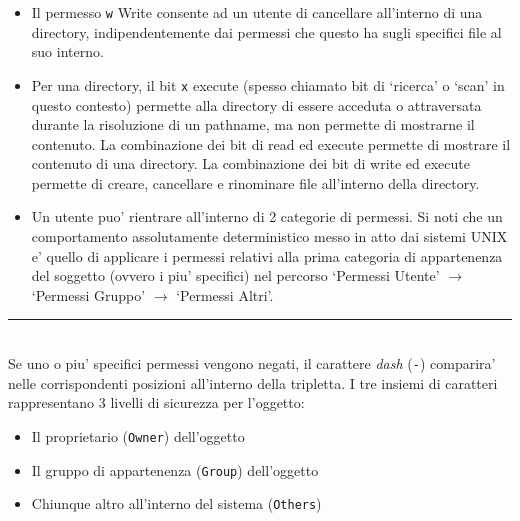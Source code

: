 \begin{itemize}
	\item Il permesso \texttt{w} Write consente ad un utente di cancellare all'interno di una directory, indipendentemente dai permessi che questo ha sugli specifici file al suo interno.
	\item Per una directory, il bit \texttt{x} execute (spesso chiamato bit di `ricerca' o `scan' in questo contesto) permette alla directory di essere acceduta o attraversata durante la risoluzione di un pathname, ma non permette di mostrarne il contenuto. La combinazione dei bit di read ed execute permette di mostrare il contenuto di una directory. La combinazione dei bit di write ed execute permette di creare, cancellare e rinominare file all'interno della directory.
	\item Un utente puo' rientrare all'interno di 2 categorie di permessi. Si noti che un comportamento assolutamente deterministico messo in atto dai sistemi UNIX e' quello di applicare i permessi relativi alla prima categoria di appartenenza del soggetto (ovvero i piu' specifici) nel percorso `Permessi Utente' $\rightarrow$ `Permessi Gruppo' $\rightarrow$ `Permessi Altri'.  
\end{itemize}
\noindent\rule{16cm}{0.4pt}\\
Se uno o piu' specifici permessi vengono negati, il carattere \emph{dash} (\texttt{-}) comparira' nelle corrispondenti posizioni all'interno della tripletta. I tre insiemi di caratteri rappresentano 3 livelli di sicurezza per l'oggetto:
\begin{itemize}
	\item Il proprietario (\texttt{Owner}) dell'oggetto
	\item Il gruppo di appartenenza (\texttt{Group}) dell'oggetto
	\item Chiunque altro all'interno del sistema (\texttt{Others})
\end{itemize}
